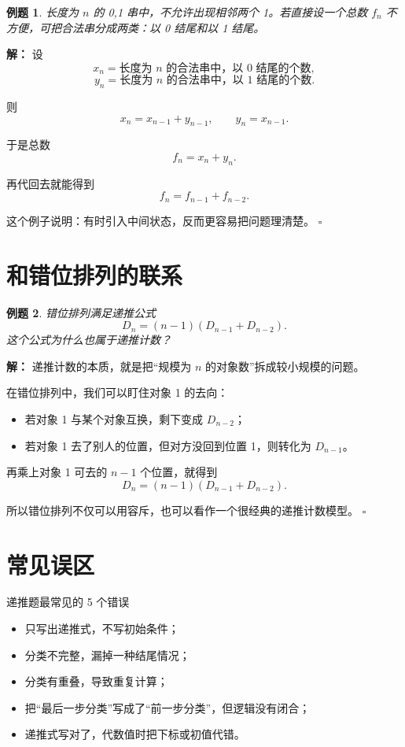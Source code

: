 \documentclass[11pt,a4paper,fontset=fandol]{ctexart}
\theoremstyle{formaltheorem}
\theoremstyle{formalexample}
\newtheorem{example}{例题}[section]
\newenvironment{solution}{\par\noindent\textbf{解：}}{\hfill$\square$\par}
\begin{document}
\begin{example}
长度为 $n$ 的 0,1 串中，不允许出现相邻两个 1。若直接设一个总数 $f_n$ 不方便，可把合法串分成两类：以 0 结尾和以 1 结尾。
\end{example}

\begin{solution}
设
\[
  x_n=\text{长度为 $n$ 的合法串中，以 0 结尾的个数},
\]
\[
  y_n=\text{长度为 $n$ 的合法串中，以 1 结尾的个数}.
\]

则
\[
  x_n=x_{n-1}+y_{n-1},
\qquad
  y_n=x_{n-1}.
\]

于是总数
\[
  f_n=x_n+y_n.
\]

再代回去就能得到
\[
  f_n=f_{n-1}+f_{n-2}.
\]

这个例子说明：有时引入中间状态，反而更容易把问题理清楚。
\end{solution}

\section{和错位排列的联系}

\begin{example}
错位排列满足递推公式
\[
  D_n=(n-1)(D_{n-1}+D_{n-2}).
\]
这个公式为什么也属于递推计数？
\end{example}

\begin{solution}
递推计数的本质，就是把“规模为 $n$ 的对象数”拆成较小规模的问题。

在错位排列中，我们可以盯住对象 1 的去向：
\begin{itemize}
  \item 若对象 1 与某个对象互换，剩下变成 $D_{n-2}$；
  \item 若对象 1 去了别人的位置，但对方没回到位置 1，则转化为 $D_{n-1}$。
\end{itemize}

再乘上对象 1 可去的 $n-1$ 个位置，就得到
\[
  D_n=(n-1)(D_{n-1}+D_{n-2}).
\]

所以错位排列不仅可以用容斥，也可以看作一个很经典的递推计数模型。
\end{solution}

\section{常见误区}

\begin{notebox}{递推题最常见的 5 个错误}
\begin{itemize}
  \item 只写出递推式，不写初始条件；
  \item 分类不完整，漏掉一种结尾情况；
  \item 分类有重叠，导致重复计算；
  \item 把“最后一步分类”写成了“前一步分类”，但逻辑没有闭合；
  \item 递推式写对了，代数值时把下标或初值代错。
\end{itemize}
\end{notebox}
\end{document}
